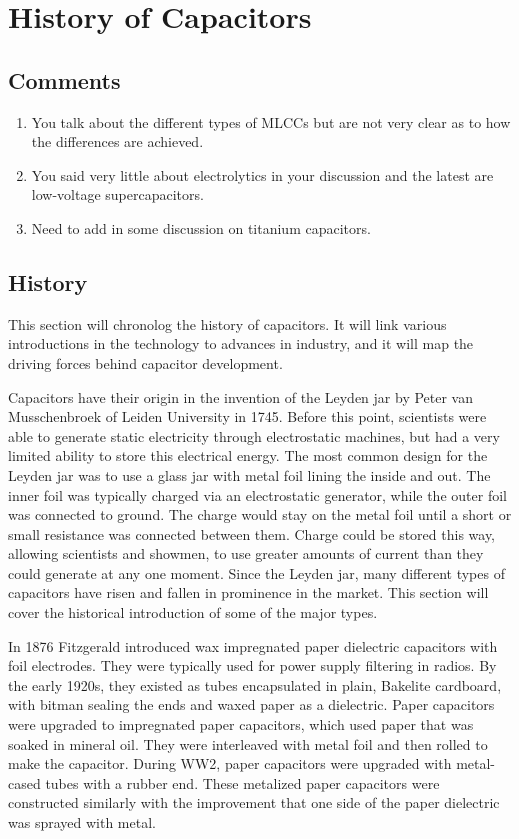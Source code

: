 \section {History of Capacitors}

\subsection{Comments}
\begin{enumerate}
    \item You talk about the different types of MLCCs but are not very clear as to how the differences are achieved.
    \item You said very little about electrolytics in your discussion and the latest are low-voltage supercapacitors.
    \item Need to add in some discussion on titanium capacitors.
\end{enumerate}

\subsection{History}
This section will chronolog the history of capacitors. It will link various introductions in the technology to advances in industry, and it will map the driving forces behind capacitor development.

Capacitors have their origin in the invention of the Leyden jar by Peter van Musschenbroek of Leiden University in 1745.\cite{empLight} Before this point, scientists were able to generate static electricity through electrostatic machines, but had a very limited ability to store this electrical energy. 
\cite{ieee_hist} 
The most common design for the Leyden jar was to use a glass jar with metal foil lining the inside and out. The inner foil was typically charged via an electrostatic generator, while the outer foil was connected to ground. The charge would stay on the metal foil until a short or small resistance was connected between them. Charge could be stored this way, allowing scientists and showmen, to use greater amounts of current than they could generate at any one moment.
Since the Leyden jar, many different types of capacitors have risen and fallen in prominence in the market. This section will cover the historical introduction of some of the major types.

In 1876 Fitzgerald introduced wax impregnated paper dielectric capacitors with foil electrodes.\cite[ch.~11]{dumInv} \cite{learn_caps} They were typically used for power supply filtering in radios. By the early 1920s, they existed as tubes encapsulated in plain, Bakelite cardboard, with bitman sealing the ends and waxed paper as a dielectric.\cite[ch~3]{dumInv}
Paper capacitors were upgraded to impregnated paper capacitors, which used paper that was soaked in mineral oil. They were interleaved with metal foil and then rolled to make the capacitor.\cite[ch.~8.2.1.1]{poorIntro} During WW2, paper capacitors were upgraded with metal-cased tubes with a rubber end.\cite[ch.~8.1]{poorIntro} These metalized paper capacitors were constructed similarly with the improvement that one side of the paper dielectric was sprayed with metal.\cite{hist_cerFilt}


